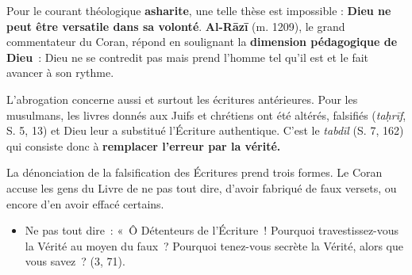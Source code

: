 

Pour le courant théologique \textbf{asharite}, une telle thèse est
impossible : \textbf{Dieu ne peut être versatile dans sa volonté}.
\textbf{Al-Rāzī} (m. 1209), le grand commentateur du Coran, répond en
soulignant la \textbf{dimension pédagogique de Dieu}~: Dieu ne se
contredit pas mais prend l'homme tel qu'il est et le fait avancer à son
rythme.


L'abrogation concerne aussi et surtout les écritures antérieures. Pour
les musulmans, les livres donnés aux Juifs et chrétiens ont été altérés,
falsifiés (\emph{taḥrīf}, S. 5, 13) et Dieu leur a substitué l'Écriture
authentique. C'est le \emph{tabdīl} (S. 7, 162) qui consiste donc à
\textbf{remplacer l'erreur par la vérité.}

La dénonciation de la falsification des Écritures prend trois formes. Le
Coran accuse les gens du Livre de ne pas tout dire, d'avoir fabriqué de
faux versets, ou encore d'en avoir effacé certains.

\begin{itemize}
\item
  Ne pas tout dire~: «~Ô Détenteurs de l'Écriture~! Pourquoi
  travestissez-vous la Vérité au moyen du faux~? Pourquoi tenez-vous
  secrète la Vérité, alors que vous savez~? (3, 71).
\end{itemize}

